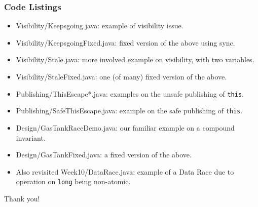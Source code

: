 \documentclass[xcolor={dvipsnames,svgnames},aspectratio=169]{beamer}
\begin{document}
\begin{frame}[fragile]
  \frametitle{Code Listings}

  \begin{itemize}
  \item[\faCode]<1-> Visibility/Keepsgoing.java: example of visibility issue.
  \item[\faCode]<1-> Visibility/KeepsgoingFixed.java: fixed version of the above
    using sync.
  \item[\faCode]<1-> Visibility/Stale.java: more involved example on visibility,
    with two variables.
  \item[\faCode]<1-> Visibility/StaleFixed.java: one (of many) fixed version of
    the above.
  \item[\faCode]<1-> Publishing/ThisEscape*.java: examples on the unsafe publishing of \texttt{this}.
  \item[\faCode]<1-> Publishing/SafeThisEscape.java: example on the safe publishing of \texttt{this}.
  \item[\faCode]<1-> Design/GasTankRaceDemo.java: our familiar example on a
    compound invariant.
  \item[\faCode]<1-> Design/GasTankFixed.java: a fixed version of the above.
  \end{itemize}

  \begin{itemize}
  \item[\faCode]<1-> Also revisited Week10/DataRace.java: example of a Data
    Race due to operation on \texttt{long} being non-atomic.
  \end{itemize}
\end{frame}

\begin{frame}{}
  \centering \huge
  Thank you!
\end{frame}
\end{document}
